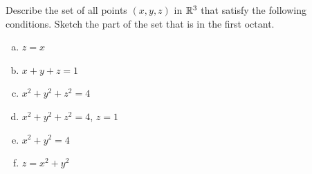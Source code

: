 \begin{question}
Describe the set of all points $(x,y,z)$ in $\mathbb{R}^3$ that satisfy
the following conditions. Sketch the part of the set that is in the 
first octant.
\begin{enumerate}[(a)]
\item
$z = x$
\item
$x + y + z = 1$
\item
$x^2 + y^2 + z^2 = 4$
\item
$x^2 + y^2 + z^2 = 4$, $z = 1$
\item
$x^2+y^2=4$
\item
$z = x^2 + y^2$
\end{enumerate}
\end{question}

%


